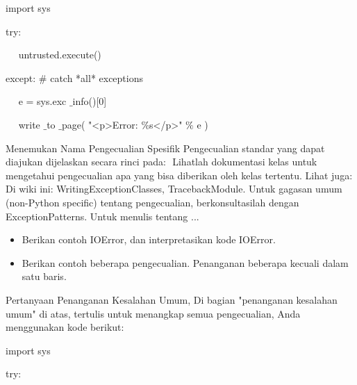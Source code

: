 {\fontsize{10pt}{10pt}\selectfont  import sys} \par
\noindent 

{\fontsize{10pt}{10pt}\selectfont  try:} \par
\noindent 

{\fontsize{10pt}{10pt}\selectfont ~~ untrusted.execute()} \par
\noindent 

{\fontsize{10pt}{10pt}\selectfont  except:  $  \#  $ catch *all* exceptions} \par
\noindent 

{\fontsize{10pt}{10pt}\selectfont ~~ e = sys.exc $  \_  $info()[0]} \par
\noindent 

{\fontsize{10pt}{10pt}\selectfont ~~ write $  \_  $to $  \_  $page( "<p>Error:  $  \%  $s</p>"  $  \%  $ e )} \par
\vspace{10pt}
\noindent 
 \hspace*{0.64in} Menemukan Nama Pengecualian Spesifik Pengecualian standar yang dapat diajukan dijelaskan secara rinci pada: $  $
 Lihatlah dokumentasi kelas untuk mengetahui pengecualian apa yang bisa diberikan oleh kelas tertentu. Lihat juga: Di wiki ini: WritingExceptionClasses, TracebackModule. Untuk gagasan umum (non-Python specific) tentang pengecualian, berkonsultasilah dengan ExceptionPatterns. Untuk menulis tentang ... \par
\noindent 
\vspace{12pt}
\noindent 
\begin{itemize}
\item Berikan contoh IOError, dan interpretasikan kode IOError. \par
\noindent 
\item Berikan contoh beberapa pengecualian. Penanganan beberapa kecuali dalam satu baris.\end{itemize}
 \par
\noindent 
\vspace{12pt}
\noindent 
Pertanyaan Penanganan Kesalahan Umum, Di bagian "penanganan kesalahan umum" di atas, tertulis untuk menangkap semua pengecualian, Anda menggunakan kode berikut: \par
\vspace{14pt}
\noindent 
{\fontsize{10pt}{10pt}\selectfont import sys} \par
\noindent 

{\fontsize{10pt}{10pt}\selectfont  try:} \par
\noindent 
\vspace{10pt}
\noindent 

